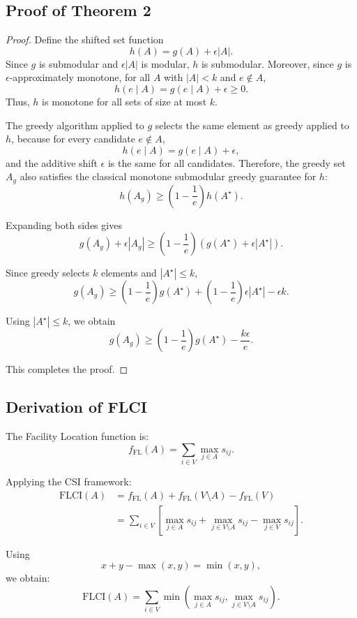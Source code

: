 \documentclass[11pt]{article}
\begin{document}
\subsection{Proof of Theorem 2}

\begin{proof}
Define the shifted set function
\[
h(A)=g(A)+\epsilon |A|.
\]
Since $g$ is submodular and $\epsilon |A|$ is modular, $h$ is submodular. Moreover, since $g$ is $\epsilon$-approximately monotone, for all $A$ with $|A|<k$ and $e\notin A$,
\[
h(e\mid A)
=
g(e\mid A)+\epsilon
\ge 0.
\]
Thus, $h$ is monotone for all sets of size at most $k$.

The greedy algorithm applied to $g$ selects the same element as greedy applied to $h$, because for every candidate $e\notin A$,
\[
h(e\mid A)=g(e\mid A)+\epsilon,
\]
and the additive shift $\epsilon$ is the same for all candidates. Therefore, the greedy set $A_g$ also satisfies the classical monotone submodular greedy guarantee for $h$:
\[
h(A_g)
\ge
\left(1-\frac{1}{e}\right)h(A^\star).
\]

Expanding both sides gives
\[
g(A_g)+\epsilon |A_g|
\ge
\left(1-\frac{1}{e}\right)
\left(g(A^\star)+\epsilon |A^\star|\right).
\]

Since greedy selects $k$ elements and $|A^\star|\le k$,
\[
g(A_g)
\ge
\left(1-\frac{1}{e}\right)g(A^\star)
+
\left(1-\frac{1}{e}\right)\epsilon |A^\star|
-
\epsilon k.
\]

Using $|A^\star|\le k$, we obtain
\[
g(A_g)
\ge
\left(1-\frac{1}{e}\right)g(A^\star)
-
\frac{k\epsilon}{e}.
\]

This completes the proof.
\end{proof}
\subsection{Derivation of FLCI}

The Facility Location function is:
\[
f_{\text{FL}}(A)
=
\sum_{i\in V}\max_{j\in A}s_{ij}.
\]

Applying the CSI framework:
\begin{align}
\text{FLCI}(A)
&=
f_{\text{FL}}(A)
+
f_{\text{FL}}(V\setminus A)
-
f_{\text{FL}}(V)
\nonumber \\
&=
\sum_{i\in V}
\left[
\max_{j\in A}s_{ij}
+
\max_{j\in V\setminus A}s_{ij}
-
\max_{j\in V}s_{ij}
\right].
\end{align}

Using
\[
x+y-\max(x,y)=\min(x,y),
\]
we obtain:
\[
\text{FLCI}(A)
=
\sum_{i\in V}
\min\left(
\max_{j\in A}s_{ij},
\max_{j\in V\setminus A}s_{ij}
\right).
\]
\end{document}

